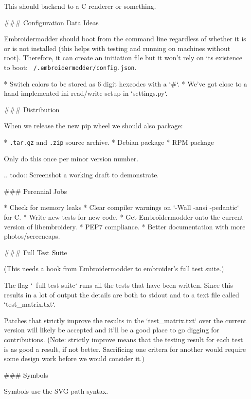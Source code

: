This should backend to a C renderer or something.

### Configuration Data Ideas

Embroidermodder should boot from the command line regardless of whether it is or is not
installed (this helps with testing and running on machines without root). Therefore, it can
create an initiation file but it won't rely on its existence to boot:
\texttt{~/.embroidermodder/config.json}.

* Switch colors to be stored as 6 digit hexcodes with a `\#`.
* We've got close to a hand implemented ini read/write setup in `settings.py`.

### Distribution


When we release the new pip wheel we should also package:

* \texttt{.tar.gz} and \texttt{.zip} source archive.
* Debian package
* RPM package

Only do this once per minor version number.

.. todo::
   Screenshot a working draft to demonstrate.

### Perennial Jobs

* Check for memory leaks
* Clear compiler warnings on `-Wall -ansi -pedantic` for C.
* Write new tests for new code.
* Get Embroidermodder onto the current version of libembroidery.
* PEP7 compliance.
* Better documentation with more photos/screencaps.

### Full Test Suite


(This needs a hook from Embroidermodder to embroider's full test suite.)

The flag `--full-test-suite` runs all the tests that have been written.
Since this results in a lot of output the details are both to stdout
and to a text file called `test\_matrix.txt`.

Patches that strictly improve the results in the `test\_matrix.txt` over
the current version will likely be accepted and it'll be a good place
to go digging for contributions. (Note: strictly improve means that
the testing result for each test is as good a result, if not better.
Sacrificing one critera for another would require some design work
before we would consider it.)

### Symbols


Symbols use the SVG path syntax.


